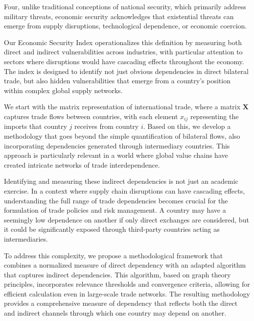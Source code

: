 \documentclass[final,1p,times,authoryear]{elsarticle}
\begin{document}
Four, unlike traditional conceptions of national security, which primarily address military threats, economic security acknowledges that existential threats can emerge from supply disruptions, technological dependence, or economic coercion.

Our Economic Security Index operationalizes this definition by measuring both direct and indirect vulnerabilities across industries, with particular attention to sectors where disruptions would have cascading effects throughout the economy. The index is designed to identify not just obvious dependencies in direct bilateral trade, but also hidden vulnerabilities that emerge from a country's position within complex global supply networks.

We start with the matrix representation of international trade, where a matrix $\mathbf{X}$ captures trade flows between countries, with each element $x_{ij}$ representing the imports that country $j$ receives from country $i$. Based on this, we develop a methodology that goes beyond the simple quantification of bilateral flows, also incorporating dependencies generated through intermediary countries. This approach is particularly relevant in a world where global value chains have created intricate networks of trade interdependence.

Identifying and measuring these indirect dependencies is not just an academic exercise. In a context where supply chain disruptions can have cascading effects, understanding the full range of trade dependencies becomes crucial for the formulation of trade policies and risk management. A country may have a seemingly low dependence on another if only direct exchanges are considered, but it could be significantly exposed through third-party countries acting as intermediaries.

To address this complexity, we propose a methodological framework that combines a normalized measure of direct dependency with an adapted algorithm that captures indirect dependencies. This algorithm, based on graph theory principles, incorporates relevance thresholds and convergence criteria, allowing for efficient calculation even in large-scale trade networks. The resulting methodology provides a comprehensive measure of dependency that reflects both the direct and indirect channels through which one country may depend on another.
\end{document}
